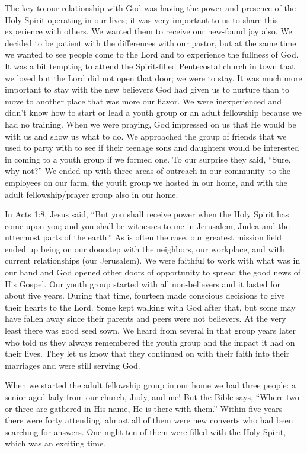 \documentclass[twoside, 12pt]{book}
\begin{document}
The key to our relationship with God was having the power and presence of the Holy Spirit operating in our lives; it was very important to us to share this experience with others. We wanted them to receive our new-found joy also. We decided to be patient with the differences with our pastor, but at the same time we wanted to see people come to the Lord and to experience the fullness of God. It was a bit tempting to attend the Spirit-filled Pentecostal church in town that we loved but the Lord did not open that door; we were to stay. It was much more important to stay with the new believers God had given us to nurture than to move to another place that was more our flavor. We were inexperienced and didn’t know how to start or lead a youth group or an adult fellowship because we had no training. When we were praying, God impressed on us that He would be with us and show us what to do. We approached the group of friends that we used to party with to see if their teenage sons and daughters would be interested in coming to a youth group if we formed one. To our surprise they said, “Sure, why not?” We ended up with three areas of outreach in our community--to the employees on our farm, the youth group we hosted in our home, and with the adult fellowship/prayer group also in our home.

In Acts 1:8, Jesus said, “But you shall receive power when the Holy Spirit has come upon you; and you shall be witnesses to me in Jerusalem, Judea and the uttermost parts of the earth.” As is often the case, our greatest mission field ended up being on our doorstep with the neighbors, our workplace, and with current relationships (our Jerusalem). We were faithful to work with what was in our hand and God opened other doors of opportunity to spread the good news of His Gospel. Our youth group started with all non-believers and it lasted for about five years. During that time, fourteen made conscious decisions to give their hearts to the Lord. Some kept walking with God after that, but some may have fallen away since their parents and peers were not believers. At the very least there was good seed sown. We heard from several in that group years later who told us they always remembered the youth group and the impact it had on their lives. They let us know that they continued on with their faith into their marriages and were still serving God.

When we started the adult fellowship group in our home we had three people: a senior-aged lady from our church, Judy, and me! But the Bible says, “Where two or three are gathered in His name, He is there with them.” Within five years there were forty attending, almost all of them were new converts who had been searching for answers. One night ten of them were filled with the Holy Spirit, which was an exciting time. 
\end{document}
